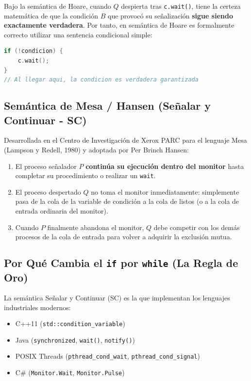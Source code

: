 \begin{aviso}
Bajo la semántica de Hoare, cuando $Q$ despierta tras \texttt{c.wait()}, tiene la certeza matemática de que la condición $B$ que provocó su señalización \textbf{sigue siendo exactamente verdadera}. Por tanto, en semántica de Hoare es formalmente correcto utilizar una sentencia condicional simple:
\begin{lstlisting}[language=C++]
if (!condicion) {
    c.wait();
}
// Al llegar aqui, la condicion es verdadera garantizada
\end{lstlisting}
\end{aviso}

\subsection{Semántica de Mesa / Hansen (Señalar y Continuar - SC)}
Desarrollada en el Centro de Investigación de Xerox PARC para el lenguaje Mesa (Lampson y Redell, 1980) y adoptada por Per Brinch Hansen:

\begin{enumerate}[leftmargin=*]
    \item El proceso señalador $P$ \textbf{continúa su ejecución dentro del monitor} hasta completar su procedimiento o realizar un \texttt{wait}.
    \item El proceso despertado $Q$ no toma el monitor inmediatamente: simplemente pasa de la cola de la variable de condición a la cola de listos (o a la cola de entrada ordinaria del monitor).
    \item Cuando $P$ finalmente abandona el monitor, $Q$ debe competir con los demás procesos de la cola de entrada para volver a adquirir la exclusión mutua.
\end{enumerate}

\subsection{Por Qué Cambia el \texttt{if} por \texttt{while} (La Regla de Oro)}
La semántica Señalar y Continuar (SC) es la que implementan los lenguajes industriales modernos:
\begin{itemize}[leftmargin=*]
    \item C++11 (\texttt{std::condition\_variable})
    \item Java (\texttt{synchronized}, \texttt{wait()}, \texttt{notify()})
    \item POSIX Threads (\texttt{pthread\_cond\_wait}, \texttt{pthread\_cond\_signal})
    \item C\# (\texttt{Monitor.Wait}, \texttt{Monitor.Pulse})
\end{itemize}

